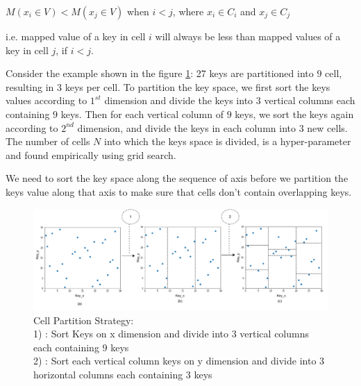 
    $ M(x_{i} \in V) <  M(x_{j} \in V)$ when $i<j$, where $x_{i} \in C_{i}$ and $x_{j} \in C_{j}$ 
    
i.e. mapped value of a key in cell $i$ will always be less than mapped values of a key in cell $j$, if $i <j$.

\begin{mscexample}
	Consider the example shown in the figure \ref{fig:Cell_Parttion}: 27 keys are partitioned into $9$ cell, resulting in $3$ keys per cell. To partition the key space, we first sort the keys values according to $1^{st}$ dimension and divide the keys into $3$ vertical columns each containing $9$ keys. Then for each vertical column of $9$ keys, we sort the keys again according to $2^{nd}$ dimension, and divide the keys in each column into $3$ new cells. The number of cells $N$ into which the keys space is divided, is a hyper-parameter and found empirically using grid search.

\end{mscexample}

We need to sort the key space along the sequence of axis before we partition the keys value along that axis to make sure that cells don't contain overlapping keys. \\

\begin{figure}[t]
    \centering
    \includegraphics[width=1\textwidth]{graphs/implementation/cell_generation.pdf}
    \caption{Cell Partition Strategy: \\
    1) : Sort Keys on x dimension and divide into 3 vertical columns each containing 9 keys\\
    2) : Sort each vertical column keys on y dimension and divide into 3 horizontal columns each containing 3 keys}
    \label{fig:Cell_Parttion}
\end{figure}

